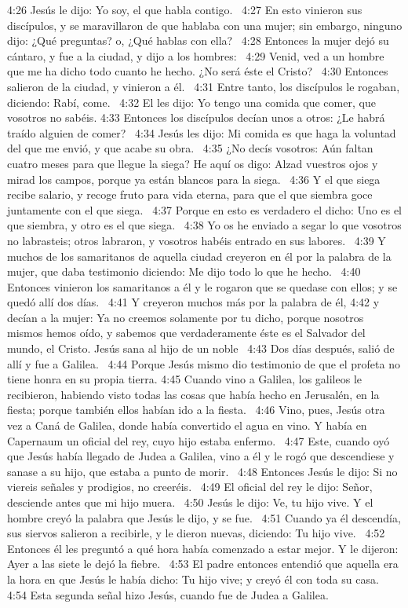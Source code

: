 4:26 Jesús le dijo: Yo soy, el que habla contigo.  
4:27 En esto vinieron sus discípulos, y se maravillaron de que hablaba con una mujer; sin embargo, ninguno dijo: ¿Qué preguntas? o, ¿Qué hablas con ella?  
4:28 Entonces la mujer dejó su cántaro, y fue a la ciudad, y dijo a los hombres:  
4:29 Venid, ved a un hombre que me ha dicho todo cuanto he hecho. ¿No será éste el Cristo?  
4:30 Entonces salieron de la ciudad, y vinieron a él.  
4:31 Entre tanto, los discípulos le rogaban, diciendo: Rabí, come.  
4:32 El les dijo: Yo tengo una comida que comer, que vosotros no sabéis. 
4:33 Entonces los discípulos decían unos a otros: ¿Le habrá traído alguien de comer?  
4:34 Jesús les dijo: Mi comida es que haga la voluntad del que me envió, y que acabe su obra.  
4:35 ¿No decís vosotros: Aún faltan cuatro meses para que llegue la siega? He aquí os digo: Alzad vuestros ojos y mirad los campos, porque ya están blancos para la siega.  
4:36 Y el que siega recibe salario, y recoge fruto para vida eterna, para que el que siembra goce juntamente con el que siega.  
4:37 Porque en esto es verdadero el dicho: Uno es el que siembra, y otro es el que siega.  
4:38 Yo os he enviado a segar lo que vosotros no labrasteis; otros labraron, y vosotros habéis entrado en sus labores.  
4:39 Y muchos de los samaritanos de aquella ciudad creyeron en él por la palabra de la mujer, que daba testimonio diciendo: Me dijo todo lo que he hecho.  
4:40 Entonces vinieron los samaritanos a él y le rogaron que se quedase con ellos; y se quedó allí dos días.  
4:41 Y creyeron muchos más por la palabra de él, 
4:42 y decían a la mujer: Ya no creemos solamente por tu dicho, porque nosotros mismos hemos oído, y sabemos que verdaderamente éste es el Salvador del mundo, el Cristo. 
Jesús sana al hijo de un noble  
4:43 Dos días después, salió de allí y fue a Galilea.  
4:44 Porque Jesús mismo dio testimonio de que el profeta no tiene honra en su propia tierra. 
4:45 Cuando vino a Galilea, los galileos le recibieron, habiendo visto todas las cosas que había hecho en Jerusalén, en la fiesta; porque también ellos habían ido a la fiesta.  
4:46 Vino, pues, Jesús otra vez a Caná de Galilea, donde había convertido el agua en vino. Y había en Capernaum un oficial del rey, cuyo hijo estaba enfermo.  
4:47 Este, cuando oyó que Jesús había llegado de Judea a Galilea, vino a él y le rogó que descendiese y sanase a su hijo, que estaba a punto de morir.  
4:48 Entonces Jesús le dijo: Si no viereis señales y prodigios, no creeréis.  
4:49 El oficial del rey le dijo: Señor, desciende antes que mi hijo muera.  
4:50 Jesús le dijo: Ve, tu hijo vive. Y el hombre creyó la palabra que Jesús le dijo, y se fue.  
4:51 Cuando ya él descendía, sus siervos salieron a recibirle, y le dieron nuevas, diciendo: Tu hijo vive.  
4:52 Entonces él les preguntó a qué hora había comenzado a estar mejor. Y le dijeron: Ayer a las siete le dejó la fiebre.  
4:53 El padre entonces entendió que aquella era la hora en que Jesús le había dicho: Tu hijo vive; y creyó él con toda su casa.  
4:54 Esta segunda señal hizo Jesús, cuando fue de Judea a Galilea.  
